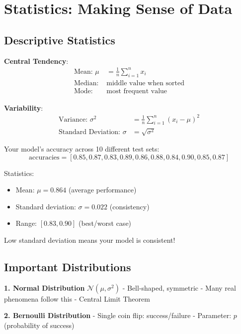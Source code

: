 \documentclass{article}
\newcounter{example}
\begin{document}
\section{Statistics: Making Sense of Data}

\subsection{Descriptive Statistics}

\textbf{Central Tendency}:
\begin{align}
\text{Mean: } \mu &= \frac{1}{n}\sum_{i=1}^n x_i \\
\text{Median: } &\text{middle value when sorted} \\
\text{Mode: } &\text{most frequent value}
\end{align}

\textbf{Variability}:
\begin{align}
\text{Variance: } \sigma^2 &= \frac{1}{n}\sum_{i=1}^n (x_i - \mu)^2 \\
\text{Standard Deviation: } \sigma &= \sqrt{\sigma^2}
\end{align}

\begin{tcolorbox}[colback=teal!5!white,colframe=teal!75!black,title=Example \stepcounter{example}\#\theexample: Model Performance Analysis]
Your model's accuracy across 10 different test sets:
$$\text{accuracies} = [0.85, 0.87, 0.83, 0.89, 0.86, 0.88, 0.84, 0.90, 0.85, 0.87]$$

Statistics:
\begin{itemize}
    \item Mean: $\mu = 0.864$ (average performance)
    \item Standard deviation: $\sigma = 0.022$ (consistency)
    \item Range: $[0.83, 0.90]$ (best/worst case)
\end{itemize}

Low standard deviation means your model is consistent!
\end{tcolorbox}

\subsection{Important Distributions}

\textbf{1. Normal Distribution} $\mathcal{N}(\mu, \sigma^2)$
- Bell-shaped, symmetric
- Many real phenomena follow this
- Central Limit Theorem

\textbf{2. Bernoulli Distribution}
- Single coin flip: success/failure
- Parameter: $p$ (probability of success)
\end{document}
